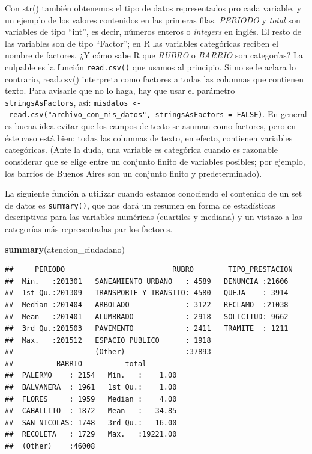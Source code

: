 \documentclass[]{book}
\newenvironment{Shaded}{\begin{snugshade}}{\end{snugshade}}
\newcommand{\KeywordTok}[1]{\textcolor[rgb]{0.13,0.29,0.53}{\textbf{#1}}}
\newcommand{\NormalTok}[1]{#1}
\begin{document}
Con str() también obtenemos el tipo de datos representados pro cada
variable, y un ejemplo de los valores contenidos en las primeras filas.
\emph{PERIODO} y \emph{total} son variables de tipo ``int'', es decir,
números enteros o \emph{integers} en inglés. El resto de las variables
son de tipo ``Factor''; en R las variables categóricas reciben el nombre
de factores. ¿Y cómo sabe R que \emph{RUBRO} o \emph{BARRIO} son
categorías? La culpable es la función \texttt{read.csv()} que usamos al
principio. Si no se le aclara lo contrario, read.csv() interpreta como
factores a todas las columnas que contienen texto. Para avisarle que no
lo haga, hay que usar el parámetro \texttt{stringsAsFactors}, así:
\texttt{misdatos\ \textless{}-\ read.csv("archivo\_con\_mis\_datos",\ stringsAsFactors\ =\ FALSE)}.
En general es buena idea evitar que los campos de texto se asuman como
factores, pero en éste caso está bien: todas las columnas de texto, en
efecto, contienen variables categóricas. (Ante la duda, una variable es
categórica cuando es razonable considerar que se elige entre un conjunto
finito de variables posibles; por ejemplo, los barrios de Buenos Aires
son un conjunto finito y predeterminado).

La siguiente función a utilizar cuando estamos conociendo el contenido
de un set de datos es \texttt{summary()}, que nos dará un resumen en
forma de estadísticas descriptivas para las variables numéricas
(cuartiles y mediana) y un vistazo a las categorías más representadas
par los factores.

\begin{Shaded}
\begin{Highlighting}[]
\KeywordTok{summary}\NormalTok{(atencion_ciudadano)}
\end{Highlighting}
\end{Shaded}

\begin{verbatim}
##     PERIODO                         RUBRO        TIPO_PRESTACION 
##  Min.   :201301   SANEAMIENTO URBANO   : 4589   DENUNCIA :21606  
##  1st Qu.:201309   TRANSPORTE Y TRANSITO: 4580   QUEJA    : 3914  
##  Median :201404   ARBOLADO             : 3122   RECLAMO  :21038  
##  Mean   :201401   ALUMBRADO            : 2918   SOLICITUD: 9662  
##  3rd Qu.:201503   PAVIMENTO            : 2411   TRAMITE  : 1211  
##  Max.   :201512   ESPACIO PUBLICO      : 1918                    
##                   (Other)              :37893                    
##          BARRIO          total         
##  PALERMO    : 2154   Min.   :    1.00  
##  BALVANERA  : 1961   1st Qu.:    1.00  
##  FLORES     : 1959   Median :    4.00  
##  CABALLITO  : 1872   Mean   :   34.85  
##  SAN NICOLAS: 1748   3rd Qu.:   16.00  
##  RECOLETA   : 1729   Max.   :19221.00  
##  (Other)    :46008
\end{verbatim}
\end{document}
